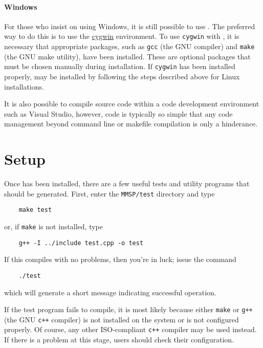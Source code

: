 \paragraph{Windows}
For those who insist on using Windows, it is still possible to use \MMSP.  The preferred way to do this is to use the \href{http://www.cygwin.com}{cygwin} environment.  To use {\tt cygwin} with \MMSP, it is necessary that appropriate packages, such as {\tt gcc} (the GNU compiler) and {\tt make} (the GNU make utility), have been installed.  These are optional packages that must be chosen manually during installation.  If {\tt cygwin} has been installed properly, \MMSP may be installed by following the steps described above for Linux installations.

It is also possible to compile \MMSP source code within a code development environment such as Visual Studio, however, \MMSP code is typically so simple that any code management beyond command line or makefile compilation is only a hinderance.

\section{Setup}
Once \MMSP has been installed, there are a few useful tests and utility programs that should be generated.  First, enter the {\tt MMSP/test} directory and type
\begin{shadebox}
\begin{verbatim}
    make test
\end{verbatim}
\end{shadebox}
or, if {\tt make} is not installed, type
\begin{shadebox}
\begin{verbatim}
    g++ -I ../include test.cpp -o test
\end{verbatim}
\end{shadebox}
If this compiles with no problems, then you're in luck; issue the command
\begin{shadebox}
\begin{verbatim}
    ./test
\end{verbatim}
\end{shadebox}
which will generate a short message indicating successful operation.

If the test program fails to compile, it is most likely because either {\tt make} or {\tt g++} (the GNU {\tt c++} compiler) is not installed on the system or is not configured properly.  Of course, any other ISO-compliant {\tt c++} compiler may be used instead.  If there is a problem at this stage, users should check their configuration.

